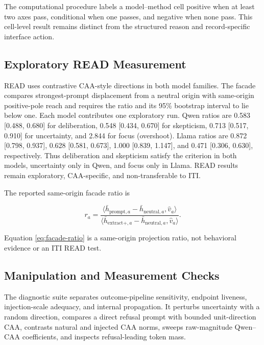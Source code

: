 \documentclass[manuscript,review,anonymous]{acmart}
\begin{document}
The computational procedure labels a model--method cell positive when at least two axes pass, conditional when one passes, and negative when none pass. {}%
This cell-level result remains distinct from the structured reason and record-specific interface action.

\subsection{Exploratory READ Measurement}\label{exploratory-read-measurement}

READ uses contrastive CAA-style directions in both model families. {}%
The facade compares strongest-prompt displacement from a neutral origin with same-origin positive-pole reach and requires the ratio and its 95\% bootstrap interval to lie below one. {}%
Each model contributes one exploratory run. {}%
Qwen ratios are 0.583 {[}0.488, 0.680{]} for deliberation, 0.548 {[}0.434, 0.670{]} for skepticism, 0.713 {[}0.517, 0.910{]} for uncertainty, and 2.844 for focus (overshoot). Llama ratios are 0.872 {[}0.798, 0.937{]}, 0.628 {[}0.581, 0.673{]}, 1.000 {[}0.839, 1.147{]}, and 0.471 {[}0.306, 0.630{]}, respectively. Thus deliberation and skepticism satisfy the criterion in both models, uncertainty only in Qwen, and focus only in Llama. {}%
{}%
READ results remain exploratory, CAA-specific, and non-transferable to ITI.

The reported same-origin facade ratio is

\begin{equation}
r_a=\frac{\langle\bar h_{\mathrm{prompt},a}-\bar h_{\mathrm{neutral},a},\hat v_a\rangle}
{\langle\bar h_{\mathrm{extract}+,a}-\bar h_{\mathrm{neutral},a},\hat v_a\rangle}.
\label{eq:facade-ratio}
\end{equation}


Equation \ref{eq:facade-ratio} is a same-origin projection ratio, not behavioral evidence or an ITI READ test.

\subsection{Manipulation and Measurement Checks}\label{manipulation-and-measurement-checks}

The diagnostic suite separates outcome-pipeline sensitivity, endpoint liveness, injection-scale adequacy, and internal propagation. It perturbs uncertainty with a random direction, compares a direct refusal prompt with bounded unit-direction CAA, contrasts natural and injected CAA norms, sweeps raw-magnitude Qwen--CAA coefficients, and inspects refusal-leading token mass. {}%
{}%
{}%
\end{document}

